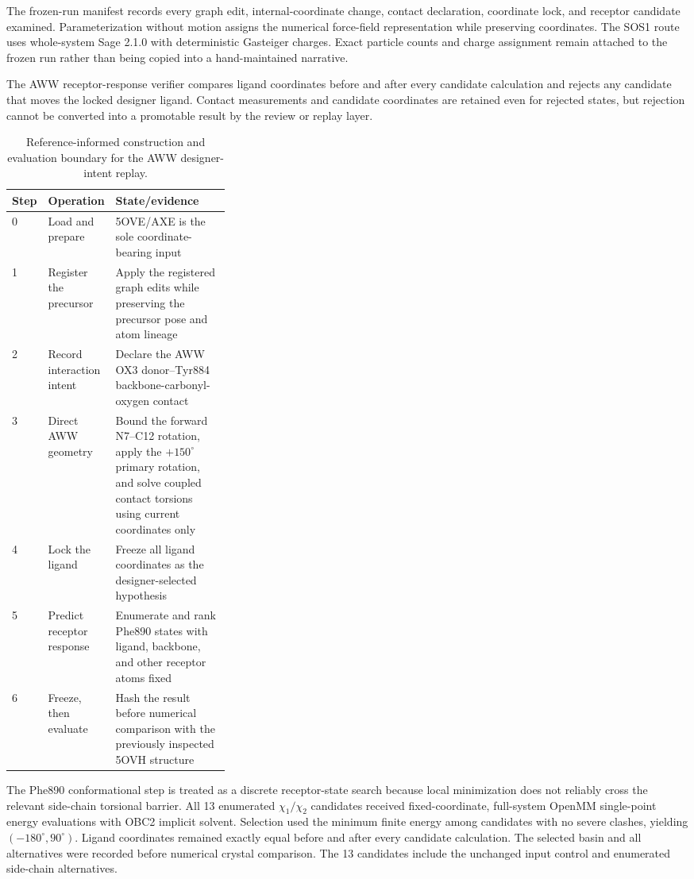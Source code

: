 \documentclass[11pt]{article}
\begin{document}
\begin{small}
The frozen-run manifest records every graph edit, internal-coordinate change, contact declaration, coordinate lock, and receptor candidate examined. Parameterization without motion assigns the numerical force-field representation while preserving coordinates. The SOS1 route uses whole-system Sage 2.1.0 with deterministic Gasteiger charges. Exact particle counts and charge assignment remain attached to the frozen run rather than being copied into a hand-maintained narrative.

The AWW receptor-response verifier compares ligand coordinates before and after every candidate calculation and rejects any candidate that moves the locked designer ligand. Contact measurements and candidate coordinates are retained even for rejected states, but rejection cannot be converted into a promotable result by the review or replay layer.

\begin{table}[htbp]
\centering\small
\caption{Reference-informed construction and evaluation boundary for the AWW designer-intent replay.}
\label{tab:appA_sos1_beats}
\begin{tabularx}{\linewidth}{@{}p{0.07\linewidth}p{0.25\linewidth}X@{}}
\toprule
\textbf{Step} & \textbf{Operation} & \textbf{State/evidence}\\
\midrule
0 & Load and prepare & 5OVE/AXE is the sole coordinate-bearing input\\
1 & Register the precursor & Apply the registered graph edits while preserving the precursor pose and atom lineage\\
2 & Record interaction intent & Declare the AWW OX3 donor--Tyr884 backbone-carbonyl-oxygen contact\\
3 & Direct AWW geometry & Bound the forward N7--C12 rotation, apply the $+150^{\circ}$ primary rotation, and solve coupled contact torsions using current coordinates only\\
4 & Lock the ligand & Freeze all ligand coordinates as the designer-selected hypothesis\\
5 & Predict receptor response & Enumerate and rank Phe890 states with ligand, backbone, and other receptor atoms fixed\\
6 & Freeze, then evaluate & Hash the result before numerical comparison with the previously inspected 5OVH structure\\
\bottomrule
\end{tabularx}
\end{table}

The Phe890 conformational step is treated as a discrete receptor-state search because local minimization does not reliably cross the relevant side-chain torsional barrier. All 13 enumerated $\chi_1/\chi_2$ candidates received fixed-coordinate, full-system OpenMM single-point energy evaluations with OBC2 implicit solvent. Selection used the minimum finite energy among candidates with no severe clashes, yielding $(-180^{\circ},90^{\circ})$. Ligand coordinates remained exactly equal before and after every candidate calculation. The selected basin and all alternatives were recorded before numerical crystal comparison. The 13 candidates include the unchanged input control and enumerated side-chain alternatives.


\end{small}
\end{document}
